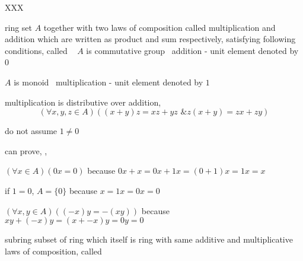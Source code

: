 \documentclass[17pt,landscape]{foils}
\begin{document}
{{\bit
\item XXX
\eit
}{}




\begin{mydefinition}{ring}
	set $A$ together with two laws of composition called multiplication and addition
	which are written as product and sum respectively, satisfying following conditions,
	called %
	\shrinkspacewithintheoremslike\
	\ibit
	\iitem
		$A$ is commutative group \wrt\ addition
			- unit element denoted by $0$\

	\iitem
		$A$ is monoid \wrt\ multiplication
			- unit element denoted by $1$\

	\iitem
		multiplication is distributive
		over addition,
		\ie\
%
		$$
			\left(
				\forall x, y, z \in A
			\right)
			\left(
				(x+y)z = xz + yz
				\mbox{ \& }
				z(x+y) = zx + zy
			\right)
		$$

	\item []
		do not assume $1\neq 0$
	\eit
\end{mydefinition}

\shrinkspacewithintheoremslike
\bit
\item
	can prove, \eg,
	\bit
	\item
		$\left( \forall x \in A \right) \left( 0x = 0 \right)$
		because
		$0x + x = 0x + 1x = (0+1)x = 1x = x$

	\item
		if $1=0$, $A=\{0\}$
		because
		$x = 1x = 0x = 0$

	\item
		$\left( \forall x,y\in A \right) \left( (-x)y = -(xy) \right)$
		because
		$xy + (-x)y = (x+ -x)y = 0y = 0$
%
	\eit
\eit

\begin{mydefinition}{subring}%
	subset of ring which itself is ring with same additive and multiplicative laws of composition,
	called \define{subring}\
\end{mydefinition}


}
\end{document}

